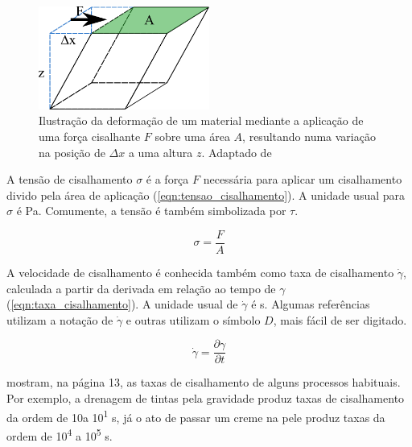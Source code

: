 			\begin{figure}[h]
				\centering
				\includegraphics[width=0.5\textwidth]{imagens/reologia/cisalhamento}
				\caption{Ilustração da deformação de um material mediante a aplicação de uma força cisalhante \(F\) sobre uma área \(A\), resultando numa variação na posição de \(\Delta x\) a uma altura \(z\). Adaptado de \citeauthor{Barnes_introduction_rheology}
				}
				\label{fig:cisalhamento}
			\end{figure} 
			
			A tensão de cisalhamento \(\sigma\) é a força \(F\) necessária para aplicar um cisalhamento divido pela área de aplicação (\autoref{eqn:tensao_cisalhamento})\cite{Kronberg2014a}. A unidade usual para \(\sigma\) é Pa. Comumente, a tensão é também simbolizada por \(\tau\). 
			
			\begin{equation}
				\sigma = \frac{F}{A}
				\label{eqn:tensao_cisalhamento}
			\end{equation}
			
			A velocidade de cisalhamento é conhecida também como taxa de cisalhamento \(\dot{\gamma}\), calculada a partir da derivada em relação ao tempo de \(\gamma\) (\autoref{eqn:taxa_cisalhamento})\cite{Kronberg2014a}. A unidade usual de \(\dot{\gamma}\) é s\menosUm.  Algumas referências utilizam a notação de \(\dot{\gamma}\) e outras utilizam o símbolo \(D\), mais fácil de ser digitado.\cite{Schramm1994}
			
			\begin{equation}
				\dot{\gamma} = \dfrac{\partial \gamma}{\partial t}
				\label{eqn:taxa_cisalhamento}
			\end{equation}
			
			\citeauthor{Barnes_introduction_rheology} mostram, na página 13, as taxas de cisalhamento de alguns processos habituais. Por exemplo, a drenagem de tintas pela gravidade produz taxas de cisalhamento da ordem de 10\menosUm a 10\textsuperscript{1} s\menosUm, já o ato de passar um creme na pele produz taxas da ordem de 10\textsuperscript{4} a 10\textsuperscript{5} s\menosUm.
						
